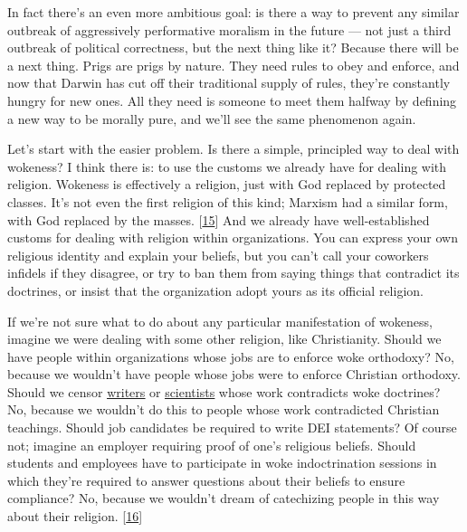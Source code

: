 In
                  fact there's an even more ambitious goal: is there a way to
                  prevent any similar outbreak of aggressively performative
                  moralism in the future --- not just a third outbreak of
                  political correctness, but the next thing like it? Because
                  there will be a next thing. Prigs are prigs by nature. They
                  need rules to obey and enforce, and now that Darwin has cut
                  off their traditional supply of rules, they're constantly
                  hungry for new ones. All they need is someone to meet them
                  halfway by defining a new way to be morally pure, and we'll
                  see the same phenomenon again.

Let's start with the
                  easier problem. Is there a simple, principled way to deal with
                  wokeness? I think there is: to use the customs we already have
                  for dealing with religion. Wokeness is effectively a religion,
                  just with God replaced by protected classes. It's not even the
                  first religion of this kind; Marxism had a similar form, with
                  God replaced by the masses.
                  [\href{\#f15n}{15}]
                  And we already have well-established customs for dealing with
                  religion within organizations. You can express your own
                  religious identity and explain your beliefs, but you can't
                  call your coworkers infidels if they disagree, or try to ban
                  them from saying things that contradict its doctrines, or
                  insist that the organization adopt yours as its official
                  religion.

If we're not sure what to do about any
                  particular manifestation of wokeness, imagine we were dealing
                  with some other religion, like Christianity. Should we have
                  people within organizations whose jobs are to enforce woke
                  orthodoxy? No, because we wouldn't have people whose jobs were
                  to enforce Christian orthodoxy. Should we censor
                  \href{https://www.telegraph.co.uk/news/2023/02/17/roald-dahl-books-rewritten-offensive-matilda-witches-twits/}{\underline{writers}}
                  or
                  \href{https://x.com/KoustaStavroula/status/1562034502897106946}{\underline{scientists}}
                  whose work contradicts woke doctrines? No, because we wouldn't
                  do this to people whose work contradicted Christian teachings.
                  Should job candidates be required to write DEI statements? Of
                  course not; imagine an employer requiring proof of one's
                  religious beliefs. Should students and employees have to
                  participate in woke indoctrination sessions in which they're
                  required to answer questions about their beliefs to ensure
                  compliance? No, because we wouldn't dream of catechizing
                  people in this way about their religion.
                  [\href{\#f16n}{16}]

